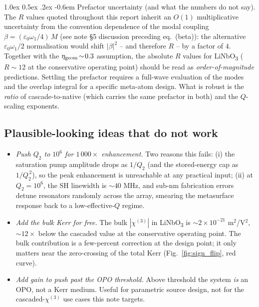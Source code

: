 \documentclass[11pt,a4paper]{article}
\makeatletter
\newcommand{\eps}{\varepsilon}
\newcommand{\chithree}{\chi^{(3)}}
\newcommand{\geom}{{\rm geom}}
\renewcommand\paragraph{%
  \@startsection{paragraph}{4}{\z@}%
                {1.0ex \@plus 0.5ex \@minus .2ex}%
                {-0.6em}%
                {\normalfont\itshape}}
\makeatother
\begin{document}
\paragraph{Prefactor uncertainty (and what the numbers do not say).}
The $R$ values quoted throughout this report inherit an $O(1)$
multiplicative uncertainty from the convention dependence of the
modal coupling $\beta=(\eps_0\omega_1/4)\,M$ (see note \S5 discussion
preceding eq.~(beta)): the alternative $\eps_0\omega_1/2$ normalisation
would shift $|\beta|^{2}$ -- and therefore $R$ -- by a factor of $4$.
Together with the $\eta_\geom\!\sim\!0.3$ assumption, the absolute
$R$ values for LiNbO\textsubscript{3} ($R\!\sim\!12$ at the conservative
operating point) should be read as \emph{order-of-magnitude}
predictions.  Settling the prefactor requires a full-wave evaluation
of the modes and the overlap integral for a specific meta-atom design.
What is robust is the \emph{ratio} of cascade-to-native (which carries
the same prefactor in both) and the $Q$-scaling exponents.

\subsection{Plausible-looking ideas that do not work}

\begin{itemize}
\item \emph{Push $Q_2$ to $10^{6}$ for $1\,000\times$ enhancement.}
  Two reasons this fails: (i) the saturation pump amplitude drops
  as $1/Q_2$ (and the stored-energy cap as $1/Q_2^{\,2}$), so the
  peak enhancement is unreachable at any practical input; (ii) at
  $Q_2 = 10^{6}$, the SH linewidth is $\sim 40$ MHz, and sub-nm
  fabrication errors detune resonators randomly across the array,
  smearing the metasurface response back to a low-effective-$Q$
  regime.
\item \emph{Add the bulk Kerr for free.} The bulk $|\chithree|$ in
  LiNbO\textsubscript{3} is $\sim 2 \!\times\! 10^{-21}$
  m$^{2}$/V$^{2}$, $\sim 12\times$ below the cascaded value at the
  conservative operating point. The bulk contribution is a few-percent
  correction at the design point; it only matters near the
  zero-crossing of the total Kerr (Fig.~\ref{fig:sign_flip}, red
  curve).
\item \emph{Add gain to push past the OPO threshold.} Above threshold
  the system \emph{is} an OPO, not a Kerr medium. Useful for
  parametric source design, not for the cascaded-$\chithree$ use cases
  this note targets.
\end{itemize}
\end{document}
